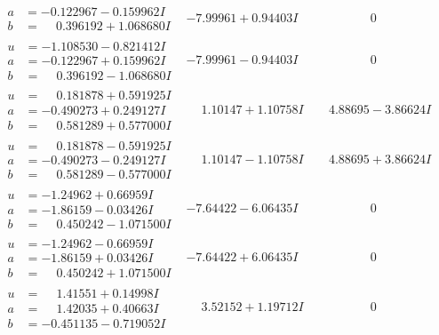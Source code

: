\documentclass[1p]{elsarticle_modified}
\theoremstyle{definition}
\begin{document}
$$\begin{array}{c|c|c}
\begin{aligned}
a &= -0.122967 - 0.159962 I \\
b &= \phantom{-}0.396192 + 1.068680 I\end{aligned}
 & -7.99961 + 0.94403 I & \phantom{-0.000000 } 0 \\ \hline\begin{aligned}
u &= -1.108530 - 0.821412 I \\
a &= -0.122967 + 0.159962 I \\
b &= \phantom{-}0.396192 - 1.068680 I\end{aligned}
 & -7.99961 - 0.94403 I & \phantom{-0.000000 } 0 \\ \hline\begin{aligned}
u &= \phantom{-}0.181878 + 0.591925 I \\
a &= -0.490273 + 0.249127 I \\
b &= \phantom{-}0.581289 + 0.577000 I\end{aligned}
 & \phantom{-}1.10147 + 1.10758 I & \phantom{-}4.88695 - 3.86624 I \\ \hline\begin{aligned}
u &= \phantom{-}0.181878 - 0.591925 I \\
a &= -0.490273 - 0.249127 I \\
b &= \phantom{-}0.581289 - 0.577000 I\end{aligned}
 & \phantom{-}1.10147 - 1.10758 I & \phantom{-}4.88695 + 3.86624 I \\ \hline\begin{aligned}
u &= -1.24962 + 0.66959 I \\
a &= -1.86159 - 0.03426 I \\
b &= \phantom{-}0.450242 - 1.071500 I\end{aligned}
 & -7.64422 - 6.06435 I & \phantom{-0.000000 } 0 \\ \hline\begin{aligned}
u &= -1.24962 - 0.66959 I \\
a &= -1.86159 + 0.03426 I \\
b &= \phantom{-}0.450242 + 1.071500 I\end{aligned}
 & -7.64422 + 6.06435 I & \phantom{-0.000000 } 0 \\ \hline\begin{aligned}
u &= \phantom{-}1.41551 + 0.14998 I \\
a &= \phantom{-}1.42035 + 0.40663 I \\
b &= -0.451135 - 0.719052 I\end{aligned}
 & \phantom{-}3.52152 + 1.19712 I & \phantom{-0.000000 } 0 \\ \hline\begin{aligned}

\end{aligned}
\end{array}$$
\end{document}
